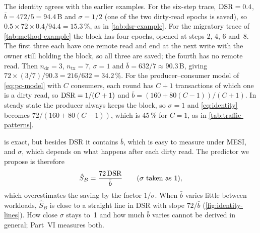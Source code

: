 The identity agrees with the earlier examples. For the six-step trace, $\mathrm{DSR}=0.4$,
$\bar b = 472/5 = 94.4$\,B and $\sigma = 1/2$ (one of the two dirty-read epochs is
saved), so $0.5\times72\times0.4/94.4 = 15.3\,\%$, as in \cref{tab:dsr-example}.
For the migratory trace of \cref{tab:method-example} the block has four epochs,
opened at steps 2, 4, 6 and~8. The first three each have one remote read and end at
the next write with the owner still holding the block, so all three are saved; the
fourth has no remote read. Then $n_{\mathrm{dr}}=3$, $n_{\mathrm{tx}}=7$, $\sigma=1$
and $\bar b = 632/7 \approx 90.3$\,B, giving $72\times(3/7)/90.3 = 216/632 =
34.2\,\%$. For the producer--consumer model of \cref{eq:pc-model} with $C$
consumers, each round has $C+1$ transactions of which one is a dirty read, so
$\mathrm{DSR} = 1/(C+1)$ and $\bar b = (160+80(C-1))/(C+1)$. In steady state the producer
always keeps the block, so $\sigma=1$ and \cref{eq:identity} becomes
$72/(160+80(C-1))$, which is 45\,\% for $C=1$, as in \cref{tab:traffic-patterns}.

 is exact, but besides DSR it contains $\bar b$, which is easy to
measure under MESI, and $\sigma$, which depends on what happens after each dirty
read. The predictor we propose is therefore
\begin{equation}
  \hat S_B = \frac{72\,\mathrm{DSR}}{\bar b}\qquad(\sigma\text{ taken as }1),
  \label{eq:predictor}
\end{equation}
which overestimates the saving by the factor $1/\sigma$. When $\bar b$ varies little
between workloads, $\hat S_B$ is close to a straight line in DSR with slope
$72/\bar b$ (\cref{fig:identity-lines}). How close $\sigma$ stays to~1 and how much
$\bar b$ varies cannot be derived in general; Part~VI measures both.

